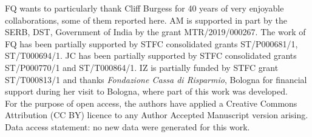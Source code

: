 FQ wants to particularly thank Cliff Burgess for 40 years of very enjoyable collaborations, some of them reported here.
 AM is supported in part by the SERB, DST, Government of India by the grant MTR/2019/000267.
 The work of FQ has been partially supported by STFC consolidated grants ST/P000681/1, ST/T000694/1. JC has been partially supported by STFC consolidated grants ST/P000770/1 and ST/T000864/1.
IZ is partially funded by STFC grant ST/T000813/1 and thanks {\em Fondazione Cassa di Risparmio}, Bologna for financial support during her visit to Bologna, where part of this work was developed.\\

For the purpose of open access,
the authors have applied a Creative Commons Attribution (CC BY) licence to any Author Accepted Manuscript version arising. Data access statement: no new data were generated for this work.

\enddocument 
 
 \newpage
 
 
 
 
 
 
 
 
 
 
 
 